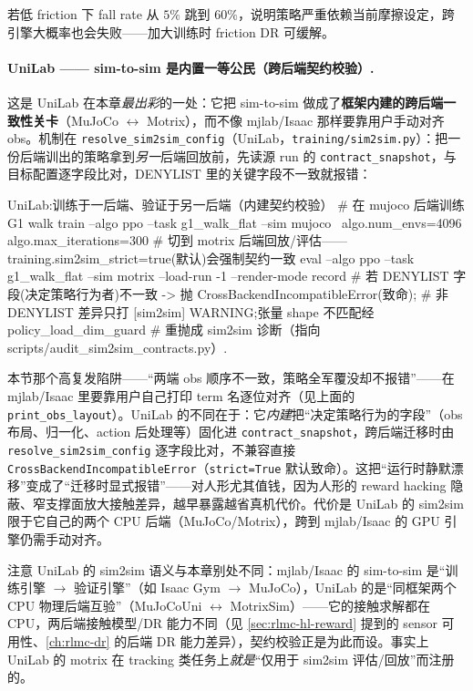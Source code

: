 若低 friction 下 fall rate 从 $5\%$ 跳到 $60\%$，说明策略严重依赖当前摩擦设定，跨引擎大概率也会失败——加大训练时 friction DR 可缓解。

\paragraph{UniLab —— sim-to-sim 是内置一等公民（跨后端契约校验）.}
这是 UniLab 在本章\emph{最出彩}的一处：它把 sim-to-sim 做成了\textbf{框架内建的跨后端一致性关卡}（MuJoCo $\leftrightarrow$ Motrix），而不像 mjlab/Isaac 那样要靠用户手动对齐 obs。机制在 \texttt{resolve\_sim2sim\_config}（UniLab，\texttt{training/\allowbreak sim2sim.\allowbreak py}）：把一份后端训出的策略拿到\emph{另一}后端回放前，先读源 run 的 \texttt{contract\_snapshot}，与目标配置逐字段比对，DENYLIST 里的关键字段不一致就报错：

\begin{codebox}[bash]{UniLab:训练于一后端、验证于另一后端（内建契约校验）}
# 在 mujoco 后端训练 G1 walk
train --algo ppo --task g1_walk_flat --sim mujoco \
    algo.num_envs=4096 algo.max_iterations=300
# 切到 motrix 后端回放/评估——training.sim2sim_strict=true(默认)会强制契约一致
eval --algo ppo --task g1_walk_flat --sim motrix --load-run -1 --render-mode record
#   若 DENYLIST 字段(决定策略行为者)不一致 -> 抛 CrossBackendIncompatibleError(致命);
#   非 DENYLIST 差异只打 [sim2sim] WARNING;张量 shape 不匹配经 policy_load_dim_guard
#   重抛成 sim2sim 诊断（指向 scripts/audit_sim2sim_contracts.py）.
\end{codebox}

\begin{insight}\label{ins:rlmc-hl-sim2sim}
本节那个高复发陷阱——“两端 obs 顺序不一致，策略全军覆没却不报错”——在 mjlab/Isaac 里要靠用户自己打印 term 名逐位对齐（见上面的 \texttt{print\_obs\_layout}）。UniLab 的不同在于：它\emph{内建}把“决定策略行为的字段”（obs 布局、归一化、action 后处理等）固化进 \texttt{contract\_snapshot}，跨后端迁移时由 \texttt{resolve\_sim2sim\_config} 逐字段比对，不兼容直接 \texttt{CrossBackendIncompatibleError}（\texttt{strict=True} 默认致命）。这把“运行时静默漂移”变成了“迁移时显式报错”——对人形尤其值钱，因为人形的 reward hacking 隐蔽、窄支撑面放大接触差异，越早暴露越省真机代价。代价是 UniLab 的 sim2sim 限于它自己的两个 CPU 后端（MuJoCo/Motrix），跨到 mjlab/Isaac 的 GPU 引擎仍需手动对齐。
\end{insight}

注意 UniLab 的 sim2sim 语义与本章别处不同：mjlab/Isaac 的 sim-to-sim 是“训练引擎 $\to$ 验证引擎”（如 Isaac Gym $\to$ MuJoCo），UniLab 的是“同框架两个 CPU 物理后端互验”（MuJoCoUni $\leftrightarrow$ MotrixSim）——它的接触求解都在 CPU，两后端接触模型/DR 能力不同（见 \cref{sec:rlmc-hl-reward} 提到的 sensor 可用性、\cref{ch:rlmc-dr} 的后端 DR 能力差异），契约校验正是为此而设。事实上 UniLab 的 motrix 在 tracking 类任务上\emph{就是}“仅用于 sim2sim 评估/回放”而注册的。

